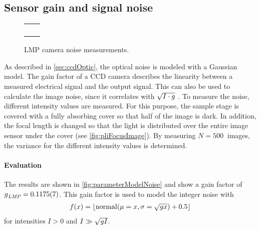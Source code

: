 \subsection{Sensor gain and signal noise}\label{sec:sensorGain}
%
\begin{figure}[!t]
\centering
%
\setlength{\tikzwidth}{0.3\textwidth}
\setlength{\tikzheight}{0.3\textwidth}
%
\setlength{\tabcolsep}{0em}
\begin{tabular}{C{0.5\textwidth}C{0.5\textwidth}}
&
\\[-1em]
%
 &
 \\[2em]
%
&
\\[-1em]
%
 &
\end{tabular}
%
\caption{\ac{LMP} camera noise measurements.}
\label{fig:parameterModelGain}
\end{figure}
%
As described in \cref{sec:ccdOptic}, the optical noise is modeled with a Gaussian model.
The gain factor of a \ac{CCD} camera describes the linearity between a measured electrical signal and the output signal.
This can also be used to calculate the image noise, since it correlates with $\sqrt{I \cdot \opticgain}$ \cite{Wiese:887678}.
To measure the noise, different intensity values are measured.
For this purpose, the sample stage is covered with a fully absorbing cover so that half of the image is dark.
In addition, the focal length is changed so that the light is distributed over the entire image sensor under the cover (see \cref{fig:pliFocusImage}).
By measuring $N=\SI{500}{}$ images, the variance for the different intensity values is determined.
%
\paragraph{Evaluation}
The results are shown in \cref{fig:parameterModelNoise} and show a gain factor of $\opticgain_{\mathit{LMP}} = \SI{0.1175(7)}{}$.
This gain factor is used to model the integer noise with
\begin{align}
f(x) = \floor{\mathrm{normal}(\mu = x, \sigma=\sqrt{\opticgain x})+0.5}
\end{align}
for intensities $I > 0$ and $I \gg \sqrt{\opticgain I}$.
%
%
%
